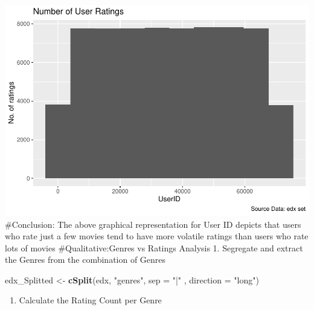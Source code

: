 \documentclass[
]{article}
\newenvironment{Shaded}{\begin{snugshade}}{\end{snugshade}}
\newcommand{\CommentTok}[1]{\textcolor[rgb]{0.56,0.35,0.01}{\textit{#1}}}
\newcommand{\DataTypeTok}[1]{\textcolor[rgb]{0.13,0.29,0.53}{#1}}
\newcommand{\DecValTok}[1]{\textcolor[rgb]{0.00,0.00,0.81}{#1}}
\newcommand{\KeywordTok}[1]{\textcolor[rgb]{0.13,0.29,0.53}{\textbf{#1}}}
\newcommand{\NormalTok}[1]{#1}
\newcommand{\OperatorTok}[1]{\textcolor[rgb]{0.81,0.36,0.00}{\textbf{#1}}}
\newcommand{\OtherTok}[1]{\textcolor[rgb]{0.56,0.35,0.01}{#1}}
\newcommand{\StringTok}[1]{\textcolor[rgb]{0.31,0.60,0.02}{#1}}
\providecommand{\tightlist}{%
  \setlength{\itemsep}{0pt}\setlength{\parskip}{0pt}}
\begin{document}
\includegraphics{MovieLensProjectReport_files/figure-latex/UserID-1.pdf}
\#Conclusion: The above graphical representation for User ID depicts
that users who rate just a few movies tend to have more volatile ratings
than users who rate lots of movies \#Qualitative:Genres vs Ratings
Analysis 1. Segregate and extract the Genres from the combination of
Genres

\begin{Shaded}
\begin{Highlighting}[]
\NormalTok{edx_Splitted <-}\StringTok{ }\KeywordTok{cSplit}\NormalTok{(edx, }\StringTok{"genres"}\NormalTok{, }\DataTypeTok{sep =} \StringTok{"|"}\NormalTok{ ,  }\DataTypeTok{direction =} \StringTok{"long"}\NormalTok{)}
\end{Highlighting}
\end{Shaded}

\begin{enumerate}
\def\labelenumi{\arabic{enumi}.}
\setcounter{enumi}{1}
\tightlist
\item
  Calculate the Rating Count per Genre
\end{enumerate}

\begin{Shaded}
\end{Shaded}
\end{document}
